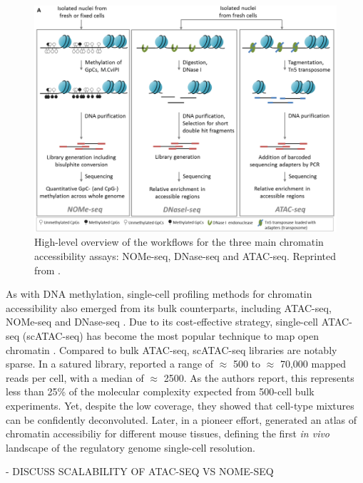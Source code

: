 \begin{figure}[H]
	\centering
	\includegraphics[width=0.8\linewidth]{ChromatinAcc_protocols}
	\caption[]{High-level overview of the workflows for the three main chromatin accessibility assays: NOMe-seq, DNase-seq and ATAC-seq. Reprinted from \cite{Nordstrom2019}. }
	\label{fig:ChromatinAcc_protocols}
\end{figure}

As with DNA methylation, single-cell profiling methods for chromatin accessibility also emerged from its bulk counterparts, including ATAC-seq\cite{Buenrostro2015a}, NOMe-seq \cite{Pott2016} and DNase-seq \cite{Jin2015}. Due to its cost-effective strategy, single-cell ATAC-seq (scATAC-seq) has become the most popular technique to map open chromatin \cite{Cusanovich2015,Cao2018,Chen2018}. Compared to bulk ATAC-seq, scATAC-seq libraries are notably sparse. In a satured library, \cite{Cusanovich2015} reported a range of $\approx$ 500 to $\approx$ 70,000 mapped reads per cell, with a median of $\approx$ 2500. As the authors report, this represents less than 25\% of the molecular complexity expected from 500-cell bulk experiments. Yet, despite the low coverage, they showed that cell-type mixtures can be confidently deconvoluted. Later, in a pioneer effort, \cite{Cusanovich2018b} generated an atlas of chromatin accessibiliy for different mouse tissues, defining the first \textit{in vivo} landscape of the regulatory genome single-cell resolution.

- DISCUSS SCALABILITY OF ATAC-SEQ VS NOME-SEQ



